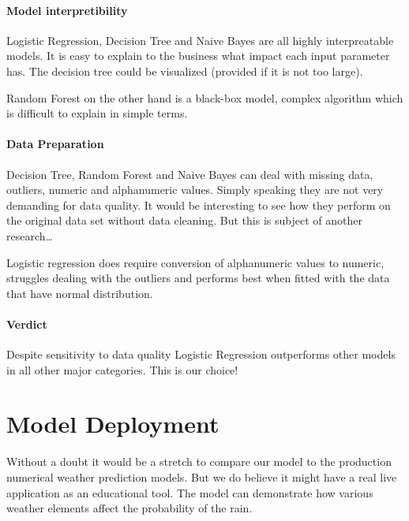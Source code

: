 \hypertarget{model-interpretibility}{%
\paragraph{Model interpretibility}\label{model-interpretibility}}

Logistic Regression, Decision Tree and Naive Bayes are all highly
interpreatable models. It is easy to explain to the business what impact
each input parameter has. The decision tree could be visualized
(provided if it is not too large).

Random Forest on the other hand is a black-box model, complex algorithm
which is difficult to explain in simple terms.

\hypertarget{data-preparation-1}{%
\paragraph{Data Preparation}\label{data-preparation-1}}

Decision Tree, Random Forest and Naive Bayes can deal with missing data,
outliers, numeric and alphanumeric values. Simply speaking they are not
very demanding for data quality. It would be interesting to see how they
perform on the original data set without data cleaning. But this is
subject of another research\ldots{}

Logistic regression does require conversion of alphanumeric values to
numeric, struggles dealing with the outliers and performs best when
fitted with the data that have normal distribution.

\hypertarget{verdict}{%
\paragraph{Verdict}\label{verdict}}

Despite sensitivity to data quality Logistic Regression outperforms
other models in all other major categories. This is our choice!

\hypertarget{model-deployment}{%
\section{Model Deployment}\label{model-deployment}}

Without a doubt it would be a stretch to compare our model to the
production numerical weather prediction models. But we do believe it
might have a real live application as an educational tool. The model can
demonstrate how various weather elements affect the probability of the
rain.

